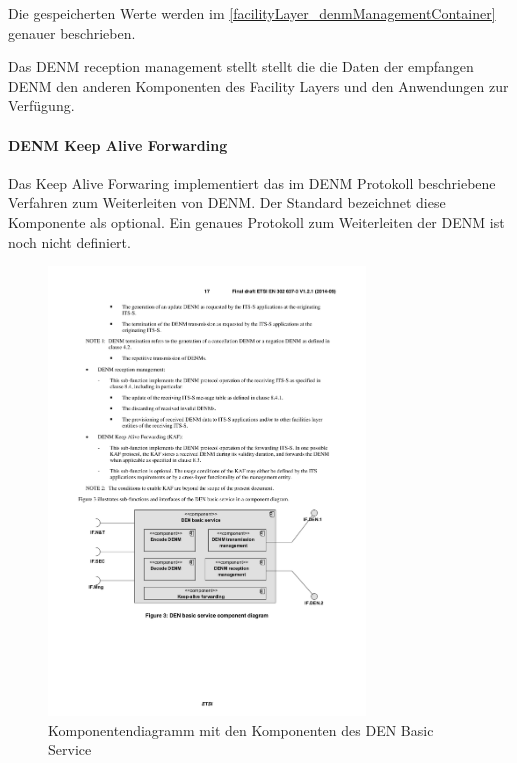 Die gespeicherten Werte werden im \autoref{facilityLayer_denmManagementContainer} genauer beschrieben.

 
Das \ac{DENM} reception management stellt stellt die die Daten der empfangen \ac{DENM} den anderen Komponenten des Facility Layers und den Anwendungen zur Verfügung.

\paragraph{DENM Keep Alive Forwarding}
Das Keep Alive Forwaring implementiert das im \ac{DENM} Protokoll beschriebene Verfahren zum Weiterleiten von \ac{DENM}. Der Standard \cite{en302637-3} bezeichnet diese Komponente als optional. Ein genaues Protokoll zum Weiterleiten der \ac{DENM} ist noch nicht definiert.




\begin{figure}[htbp]
	\includegraphics[width=0.75\textwidth]{content/images/04_facilitylayer/denBasicServiceKomponenten.pdf}
	\caption{Komponentendiagramm mit den Komponenten des DEN Basic Service \cite{en302637-3}}
	\label{fig:darstellungDenBasicServiceKomponenten}
\end{figure}

